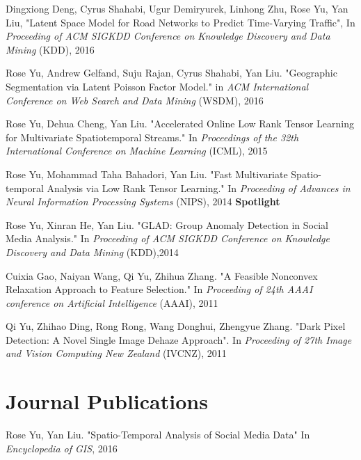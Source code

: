 \documentclass[margin,line]{res}
\begin{document}
\begin{resume}
\begin{enumerate}[label={[C\arabic*]}]
\item Dingxiong Deng, Cyrus Shahabi, Ugur Demiryurek, Linhong Zhu,  Rose Yu, Yan Liu, 
"Latent Space Model for Road Networks to Predict Time-Varying Traffic", In \textit{Proceeding of ACM SIGKDD Conference on Knowledge Discovery and Data Mining } (KDD), 2016


\item Rose Yu, Andrew Gelfand, Suju Rajan, Cyrus Shahabi, Yan Liu. "Geographic Segmentation via Latent Poisson Factor Model." in \textit{ACM International Conference on Web Search and Data Mining} (WSDM), 2016 

\item Rose Yu, Dehua Cheng, Yan Liu. "Accelerated Online Low Rank Tensor Learning for Multivariate Spatiotemporal Streams." In \textit{Proceedings  of the 32th International Conference on Machine Learning} (ICML), 2015

\item Rose Yu, Mohammad Taha Bahadori, Yan Liu. "Fast Multivariate Spatio-temporal Analysis via Low Rank Tensor Learning." In \textit{Proceeding of Advances in Neural Information Processing Systems} (NIPS), 2014 \textbf{Spotlight}

\item Rose Yu, Xinran He, Yan Liu. "GLAD: Group Anomaly Detection in Social Media Analysis." In \textit{Proceeding of ACM SIGKDD Conference on Knowledge Discovery and Data Mining} (KDD),2014

\item Cuixia Gao, Naiyan Wang, Qi Yu, Zhihua Zhang. "A Feasible Nonconvex Relaxation Approach to Feature Selection." In \textit{Proceeding of 24th AAAI conference on Artificial Intelligence} (AAAI), 2011 

\item  Qi Yu, Zhihao Ding, Rong Rong, Wang Donghui, Zhengyue Zhang. "Dark Pixel Detection: A Novel Single Image Dehaze Approach". In \textit{Proceeding of 27th Image and Vision Computing New Zealand }(IVCNZ), 2011  
\end{enumerate}

 
\section{\sc Journal Publications}
\begin{enumerate}[label={[J\arabic*]}]
\item Rose Yu,  Yan Liu.  "Spatio-Temporal Analysis of Social Media Data"  In \textit{Encyclopedia of GIS}, 2016


\end{enumerate}
\end{resume}
\end{document}
